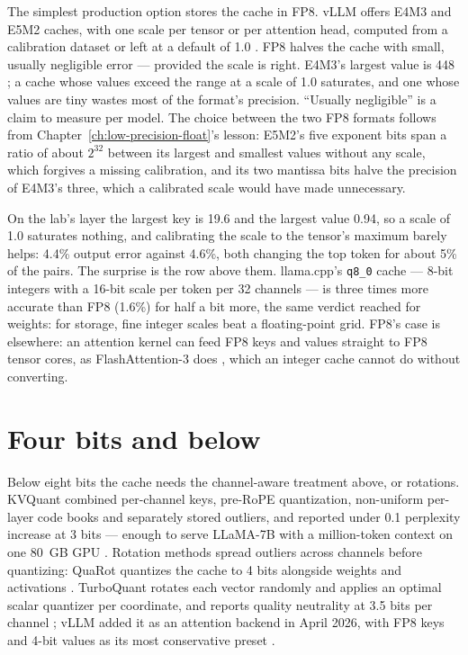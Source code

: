 The simplest production option stores the cache in FP8. vLLM offers E4M3 and
E5M2 caches, with one scale per tensor or per attention head, computed from a
calibration dataset or left at a default of 1.0 \cite{vllm2026kvcache}.
FP8 halves the cache with small, usually negligible error --- provided the
scale is right. E4M3's largest value is 448 \cite{micikevicius2022fp8}; a cache
whose values exceed the range at a scale of 1.0 saturates, and one whose values
are tiny wastes most of the format's precision. ``Usually negligible'' is a
claim to measure per model. The choice between the two FP8 formats follows from
Chapter~\ref{ch:low-precision-float}'s lesson: E5M2's five exponent bits span a ratio
of about $2^{32}$ between its largest and smallest values without any scale, which forgives a missing
calibration, and its two mantissa bits halve the precision of E4M3's three,
which a calibrated scale would have made unnecessary.

On the lab's layer the largest key is 19.6 and the largest value 0.94, so a
scale of 1.0 saturates nothing, and calibrating the scale to the tensor's
maximum barely helps: 4.4\% output error against 4.6\%, both changing the top
token for about 5\% of the pairs. The surprise is the row above them. llama.cpp's
\texttt{q8\_0} cache --- 8-bit integers with a 16-bit scale per token per 32
channels --- is three times more accurate than FP8 (1.6\%) for half a bit more,
the same verdict  reached for weights: for storage,
fine integer scales beat a floating-point grid. FP8's case is elsewhere: an
attention kernel can feed FP8 keys and values straight to FP8 tensor cores, as
FlashAttention-3 does \cite{shah2024flashattention3}, which an integer cache
cannot do without converting.

\section{Four bits and below}

Below eight bits the cache needs the channel-aware treatment above, or
rotations. KVQuant combined per-channel keys, pre-RoPE quantization,
non-uniform per-layer code books and separately stored outliers, and reported
under 0.1 perplexity increase at 3 bits --- enough to serve LLaMA-7B with a
million-token context on one 80~GB GPU \cite{hooper2024kvquant}. Rotation
methods spread outliers across channels before quantizing: QuaRot quantizes the
cache to 4 bits alongside weights and activations \cite{ashkboos2024quarot}.
TurboQuant rotates each vector randomly and applies an optimal scalar quantizer
per coordinate, and reports quality neutrality at 3.5 bits per channel
\cite{zandieh2025turboquant}; vLLM added it as an attention backend in April
2026, with FP8 keys and 4-bit values as its most conservative preset
\cite{vllm2026turboquantpr}.

